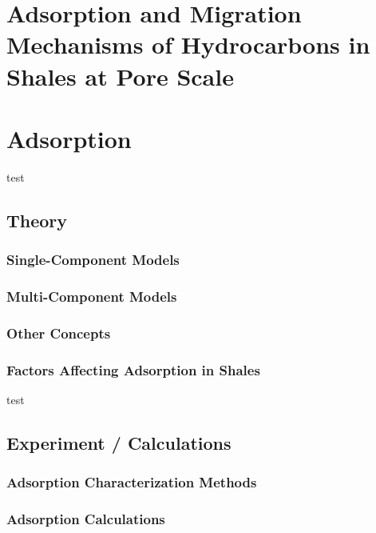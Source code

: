 \documentclass[11pt]{article}
\date{\today}
\title{}
\begin{document}
\tableofcontents

\section{Adsorption and Migration Mechanisms of Hydrocarbons in Shales at Pore Scale}
\label{sec:orgb25529f}

\section{Adsorption}
\label{sec:org092ae31}

test 

\subsection{Theory}
\label{sec:org4532a71}

\subsubsection{Single-Component Models}
\label{sec:org0cbf0a8}

\subsubsection{Multi-Component Models}
\label{sec:org09c8902}

\subsubsection{Other Concepts}
\label{sec:orgefd06c5}

\subsubsection{Factors Affecting Adsorption in Shales}
\label{sec:org5abb3a0}

test \cite{rouquerol2016surface}

\subsection{Experiment / Calculations}
\label{sec:org3b8c976}

\subsubsection{Adsorption Characterization Methods}
\label{sec:orgccfac2e}

\subsubsection{Adsorption Calculations}
\label{sec:org2d2b7c0}
\end{document}
